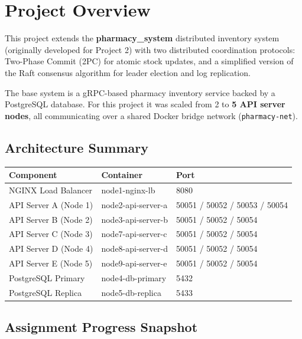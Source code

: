 \section{Project Overview}

This project extends the \textbf{pharmacy\_system} distributed inventory system
(originally developed for Project 2) with two distributed coordination protocols:
Two-Phase Commit (2PC) for atomic stock updates, and a simplified version of the
Raft consensus algorithm for leader election and log replication.

The base system is a gRPC-based pharmacy inventory service backed by a PostgreSQL
database. For this project it was scaled from 2 to \textbf{5 API server nodes},
all communicating over a shared Docker bridge network (\texttt{pharmacy-net}).

\subsection*{Architecture Summary}

\begin{center}
\begin{tabular}{lll}
  \toprule
  Component & Container & Port \\
  \midrule
  NGINX Load Balancer      & node1-nginx-lb       & 8080 \\
  API Server A (Node 1)    & node2-api-server-a   & 50051 / 50052 / 50053 / 50054 \\
  API Server B (Node 2)    & node3-api-server-b   & 50051 / 50052 / 50054 \\
  API Server C (Node 3)    & node7-api-server-c   & 50051 / 50052 / 50054 \\
  API Server D (Node 4)    & node8-api-server-d   & 50051 / 50052 / 50054 \\
  API Server E (Node 5)    & node9-api-server-e   & 50051 / 50052 / 50054 \\
  PostgreSQL Primary       & node4-db-primary     & 5432 \\
  PostgreSQL Replica       & node5-db-replica     & 5433 \\
  \bottomrule
\end{tabular}
\end{center}

\subsection*{Assignment Progress Snapshot}

